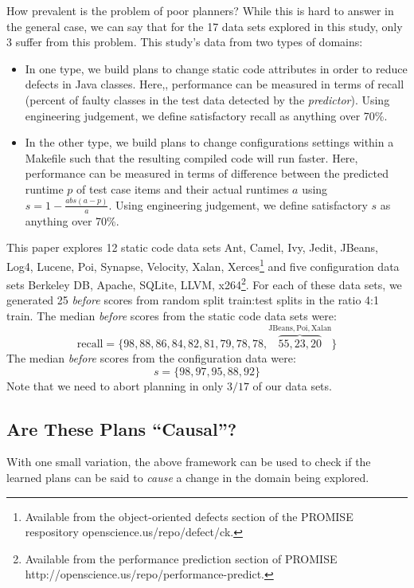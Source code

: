 \documentclass[conference]{IEEEtran}
\newcommand{\bi}{\begin{itemize}}
\newcommand{\ei}{\end{itemize}}
\begin{document}
How prevalent is the problem of poor planners? While
this is hard to answer in the general case, we can say that for the 17 data
sets explored in this study, only 3 suffer from this problem.
This study's    data   from two  types of domains:
\bi
\item
In one type, we 
build plans to change static code attributes in order to reduce defects in
Java classes.  Here,,
performance can be measured in terms of recall (percent of faulty classes in
the test data detected
by the {\em predictor}). Using engineering judgement, we define satisfactory recall as anything over   70\%. 
\item 
In the other type, we   build
plans to change configurations settings within a Makefile such that the resulting compiled
code will run faster. Here, performance can be measured in terms of difference
between the predicted runtime $p$ of test case items and their actual runtimes $a$
using  $s= 1- \frac{abs(a - p)}{a}$.
Using engineering judgement, we define satisfactory $s$ as anything over   70\%. 
\ei
This paper explores 12 static code data sets
Ant, Camel, Ivy, Jedit, JBeans, Log4, Lucene, Poi, Synapse, Velocity, Xalan, Xerces\footnote{Available from the object-oriented defects section of the PROMISE respository openscience.us/repo/defect/ck.} and five configuration data sets Berkeley DB, Apache, SQLite, LLVM,
  x264\footnote{Available from the performance prediction section of PROMISE
  http://openscience.us/repo/performance-predict.}. For each of these data sets,
  we generated 25 {\em before} scores from
  random split train:test splits in the ratio 4:1 train.
 The median {\em before} scores from  the static code data sets were:
\[\mathrm{recall}=\{98,88,86,84,82,81,79,78,78,\overbrace{55,23,20}^{\mathrm{JBeans,Poi,Xalan}}\}\]
The median {\em before}   scores from  the configuration data were:
\[s=\{98,97,95,88,92\}\]
Note that we need to abort planning in only $3/17$ of our data sets.  
 
\subsection{Are These Plans ``Causal''?}
With one small variation,  the above framework can be used to check if the learned
plans can be said to {\em cause} a change in the domain being explored.
\end{document}

